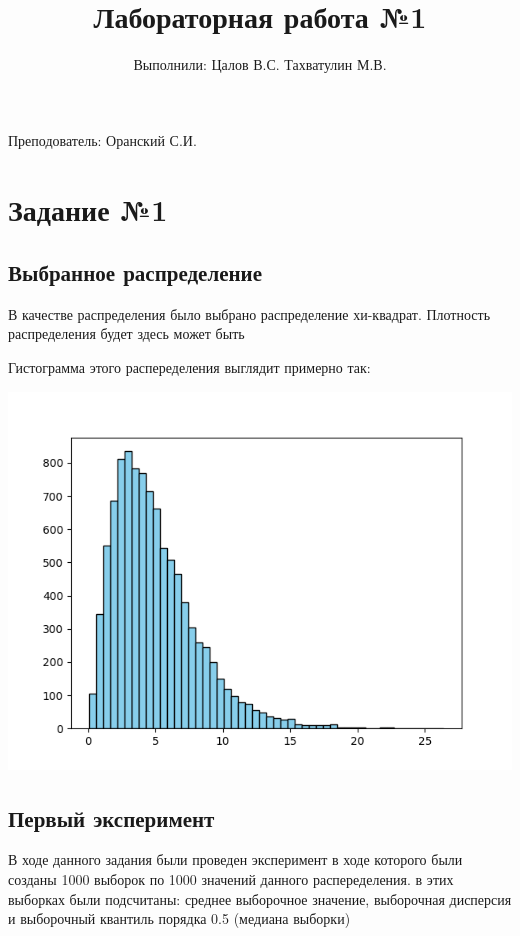 \documentclass{article}
\title{Лабораторная работа №1}
\author{Выполнили: Цалов В.С. Тахватулин М.В.}
\begin{document}
\maketitle
Преподователь: Оранский С.И.


\section{Задание №1}
\subsection{Выбранное распределение}

В качестве распределения было выбрано распределение хи-квадрат.
Плотность распределения будет здесь может быть

Гистограмма этого распеределения выглядит примерно так:

\begin{center}
      \centering
      \includegraphics[width=0.5\linewidth]{Python/chi.png}
\end{center}

\subsection{Первый эксперимент}
В ходе данного задания были проведен эксперимент в ходе которого были созданы 1000 выборок по 1000 значений данного распеределения.
в этих выборках были подсчитаны: среднее выборочное значение, выборочная дисперсия и выборочный квантиль порядка 0.5 (медиана выборки) 
\end{document}
